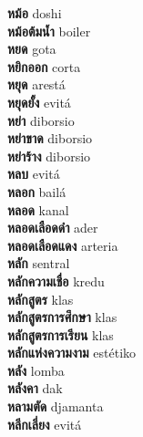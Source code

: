 \textbf{ หม้อ  } doshi \\
\textbf{ หม้อต้มน้ำ  } boiler \\
\textbf{ หยด  } gota \\
\textbf{ หยิกออก  } corta \\
\textbf{ หยุด  } arestá \\
\textbf{ หยุดยั้ง  } evitá \\
\textbf{ หย่า  } diborsio \\
\textbf{ หย่าขาด  } diborsio \\
\textbf{ หย่าร้าง  } diborsio \\
\textbf{ หลบ  } evitá \\
\textbf{ หลอก  } bailá \\
\textbf{ หลอด  } kanal \\
\textbf{ หลอดเลือดดำ  } ader \\
\textbf{ หลอดเลือดแดง  } arteria \\
\textbf{ หลัก  } sentral \\
\textbf{ หลักความเชื่อ  } kredu \\
\textbf{ หลักสูตร  } klas \\
\textbf{ หลักสูตรการศึกษา  } klas \\
\textbf{ หลักสูตรการเรียน  } klas \\
\textbf{ หลักแห่งความงาม  } estétiko \\
\textbf{ หลัง  } lomba \\
\textbf{ หลังคา  } dak \\
\textbf{ หลามตัด  } djamanta \\
\textbf{ หลีกเลี่ยง  } evitá \\
